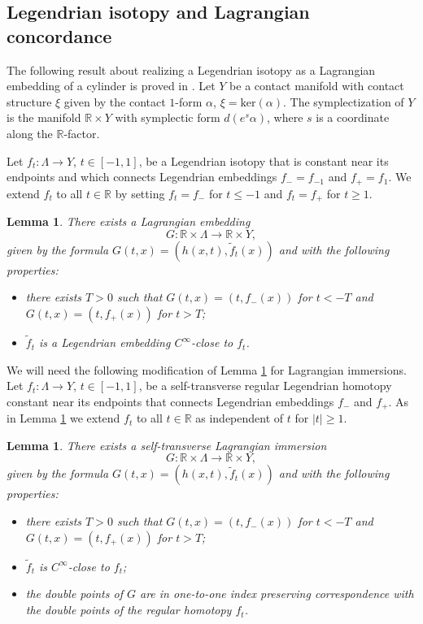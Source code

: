 \documentclass[reqno,11pt]{amsart}
\numberwithin{equation}{section}
\theoremstyle{my}
\theoremstyle{my}
\newtheorem{Lemma}[thm]{Lemma}
\theoremstyle{your}
\newcommand{\R}{\mathbb{R}}
\renewcommand{\ker}{\mathrm{ker}}
\newcommand{\wt}{\widetilde}
\begin{document}
 

\subsection{Legendrian isotopy and Lagrangian concordance}
The following result about realizing a Legendrian isotopy as a Lagrangian embedding of a cylinder is proved in \cite[Lemma 4.2.5]{ELIGRO-findim}. Let $Y$ be a contact manifold with contact structure $\xi$ given by the contact $1$-form $\alpha$, $\xi=\ker(\alpha)$. The symplectization of $Y$ is the manifold $\R\times Y$ with symplectic form $d(e^{s}\alpha)$, where $s$ is a coordinate along the $\R$-factor. 

Let $f_t\colon\Lambda\to Y$, $t\in[-1,1]$, be a Legendrian isotopy that is constant near its endpoints and which connects Legendrian embeddings $f_{-}=f_{-1}$ and $f_{+}=f_{1}$. We extend $f_t$ to all $t\in\R$ by setting $f_t=f_-$ for $t\leq -1$ and $f_t=f_+$ for $t\geq 1$. 
\begin{Lemma}\label{lm:Leg-Lag}
There exists a Lagrangian embedding
$$
G\colon\R\times\Lambda\to \R\times Y,
$$ 
given by the formula $G(t,x)=(h(x,t),\wt f_{t}(x))$ and with the following properties:
\begin{itemize}
\item there exists $T>0$ such that $G(t,x)=(t,f_-(x))$ for $t<-T$ and $G(t,x)=(t,f_+(x))$ for $t>T$;
\item $\wt f_{t}$ is a Legendrian embedding $C^\infty$-close to  $f_{t}$.
\end{itemize}
 \end{Lemma}


We will need the following modification of Lemma \ref{lm:Leg-Lag} for Lagrangian immersions.
Let $f_t\colon\Lambda\to Y$, $t\in[-1,1]$, be a self-transverse regular Legendrian homotopy constant near its endpoints that connects Legendrian embeddings $f_-$ and $f_+$. As in Lemma \ref{lm:Leg-Lag} we extend $f_t$ to all $t\in\R $ as independent of $t$ for $|t|\ge 1$.

\begin{Lemma}\label{lm:Leg-Lag-imm}
There exists a self-transverse Lagrangian immersion
$$
G\colon \R\times\Lambda \to \R\times Y,
$$ 
given by the formula $G(t,x)=(h(x,t),\wt f_{t}(x))$ and with the following properties:
\begin{itemize}
\item
there exists $T>0$ such that $G(t,x)=(t,f_{-}(x))$ for $t<-T$ and $G(t,x)=(t,f_{+}(x))$ for $t>T$;
\item $\wt f_{t}$ is  $C^\infty$-close to  $f_{t}$;
\item the double  points of $G$ are in one-to-one index preserving correspondence with the  double points of the regular homotopy $f_t$.
\end{itemize}
\end{Lemma}
\end{document}
